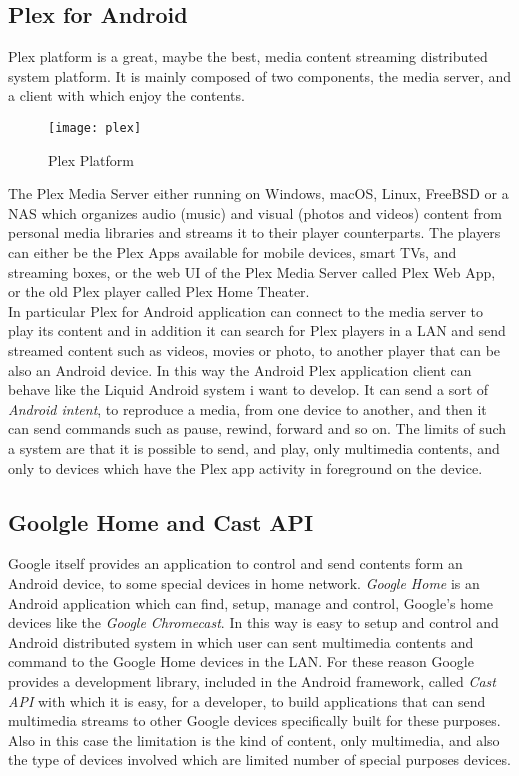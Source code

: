 \subsection{Plex for Android}
Plex platform is a great, maybe the best, media content streaming distributed system platform. It is mainly composed of two components, the media server, and a client with which enjoy the contents.
\begin{figure}[h]
	\centering
	\texttt{[image: plex]}
	\caption{Plex Platform}
	\label{fig:4.1}
\end{figure}
The Plex Media Server either running on Windows, macOS, Linux, FreeBSD or a NAS which organizes audio (music) and visual (photos and videos) content from personal media libraries and streams it to their player counterparts.
The players can either be the Plex Apps available for mobile devices, smart TVs, and streaming boxes, or the web UI of the Plex Media Server called Plex Web App, or the old Plex player called Plex Home Theater.\\
In particular Plex for Android application can connect to the media server to play its content and in addition it can search for Plex players in a LAN and send streamed content such as videos, movies or photo, to another player that can be also an Android device. In this way the Android Plex application client can behave like the Liquid Android system i want to develop. It can send a sort of \textit{Android intent}, to reproduce a media, from one device to another, and then it can send commands such as pause, rewind, forward and so on. The limits of such a system are that it is possible to send, and play, only multimedia contents, and only to devices which have the Plex app activity in foreground on the device.

\subsection{Goolgle Home and Cast API}
Google itself provides an application to control and send contents form an Android device, to some special devices in home network. \textit{Google Home} is an Android application which can find, setup, manage and control, Google's home devices like the \textit{Google Chromecast}. In this way is easy to setup and control and Android distributed system in which user can sent multimedia contents and command to the Google Home devices in the LAN. For these reason Google provides a development library, included in the Android framework, called \textit{Cast API} with which it is easy, for a developer, to build applications that can send multimedia streams to other Google devices specifically built for these purposes.\\
Also in this case the limitation is the kind of content, only multimedia, and also the type of devices involved which are limited number of special purposes devices.

